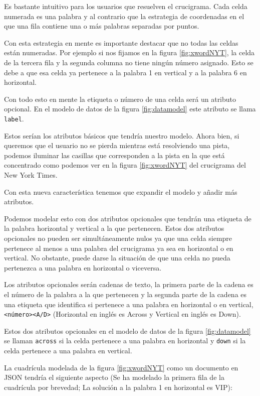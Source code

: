 \documentclass[12pt, a4paper]{article}
\begin{document}
Es bastante intuitivo para los usuarios que resuelven el crucigrama. Cada celda
numerada es una palabra y al contrario que la estrategia de coordenadas en el que
una fila contiene una o más palabras separadas por puntos.
 
Con esta estrategia en mente es importante destacar que no todas las celdas están
numeradas. Por ejemplo si nos fijamos en la figura \ref{fig:xwordNYT}, la celda de 
la tercera fila y la segunda columna no tiene ningún número asignado. Esto se debe
a que esa celda ya pertenece a la palabra 1 en vertical y a la palabra 6 en horizontal.

Con todo esto en mente la etiqueta o número de una celda será un atributo opcional.
En el modelo de datos de la figura \ref{fig:datamodel} este atributo se llama
\verb*|label|.

Estos serían los atributos básicos que tendría nuestro modelo. Ahora bien, si
queremos que el usuario no se pierda mientras está resolviendo una pista, podemos
iluminar las casillas que corresponden a la pista en la que está concentrado
como podemos ver en la figura \ref{fig:xwordNYT} del crucigrama del New York Times.

Con esta nueva característica tenemos que expandir el modelo y añadir más atributos.

Podemos modelar esto con dos atributos opcionales que tendrán una etiqueta de la
palabra horizontal y vertical a la que pertenecen. Estos dos atributos opcionales
no pueden ser simultáneamente nulos ya que una celda siempre pertenece al menos a
una palabra del crucigrama ya sea en horizontal o en vertical. No obstante, puede
darse la situación de que una celda no pueda pertenezca a una palabra en horizontal
o viceversa.

Los atributos opcionales serán cadenas de texto, la primera parte de la cadena es
el número de la palabra a la que pertenecen y la segunda parte de la cadena es una
etiqueta que identifica si pertenece a una palabra en horizontal o en vertical,
\verb*|<número><A/D>| (Horizontal en inglés es Across y Vertical en inglés es Down).

Estos dos atributos opcionales en el modelo de datos de la figura \ref{fig:datamodel}
se llaman \verb*|across| si la celda pertenece a una palabra en horizontal y \verb*|down|
si la celda pertenece a una palabra en vertical.

La cuadrícula modelada de la figura \ref{fig:xwordNYT} como un documento en JSON
tendría el siguiente aspecto (Se ha modelado la primera fila de la cuadrícula por brevedad;
La solución a la palabra 1 en horizontal es VIP):
\end{document}
